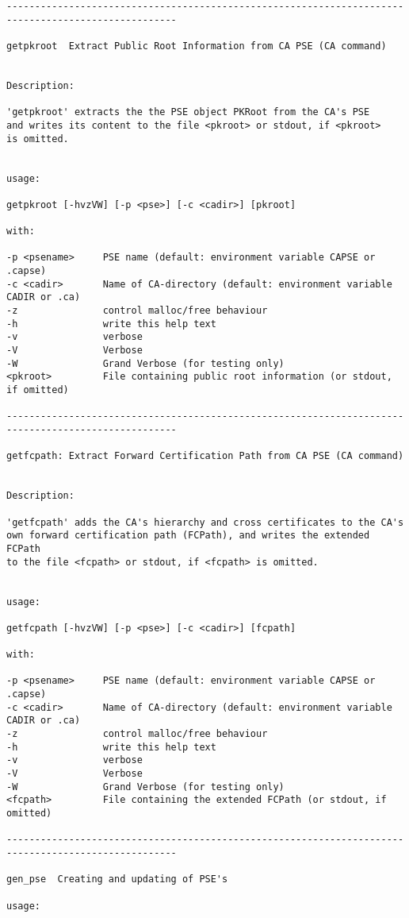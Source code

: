 {\begin{verbatim}
----------------------------------------------------------------------------------------------------

getpkroot  Extract Public Root Information from CA PSE (CA command)


Description:

'getpkroot' extracts the the PSE object PKRoot from the CA's PSE
and writes its content to the file <pkroot> or stdout, if <pkroot>
is omitted.


usage:

getpkroot [-hvzVW] [-p <pse>] [-c <cadir>] [pkroot]

with:

-p <psename>     PSE name (default: environment variable CAPSE or .capse)
-c <cadir>       Name of CA-directory (default: environment variable CADIR or .ca)
-z               control malloc/free behaviour
-h               write this help text
-v               verbose
-V               Verbose
-W               Grand Verbose (for testing only)
<pkroot>         File containing public root information (or stdout, if omitted)

----------------------------------------------------------------------------------------------------

getfcpath: Extract Forward Certification Path from CA PSE (CA command)


Description:

'getfcpath' adds the CA's hierarchy and cross certificates to the CA's
own forward certification path (FCPath), and writes the extended FCPath
to the file <fcpath> or stdout, if <fcpath> is omitted.


usage:

getfcpath [-hvzVW] [-p <pse>] [-c <cadir>] [fcpath]

with:

-p <psename>     PSE name (default: environment variable CAPSE or .capse)
-c <cadir>       Name of CA-directory (default: environment variable CADIR or .ca)
-z               control malloc/free behaviour
-h               write this help text
-v               verbose
-V               Verbose
-W               Grand Verbose (for testing only)
<fcpath>         File containing the extended FCPath (or stdout, if omitted)

----------------------------------------------------------------------------------------------------

gen_pse  Creating and updating of PSE's

usage:


\end{verbatim}}
